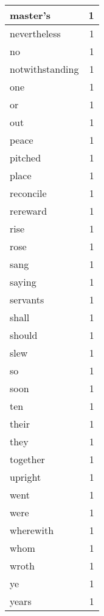 \begin{center}
\begin{longtable}{l|r}
master's & 1 \\ \hline
nevertheless & 1 \\ \hline
no & 1 \\ \hline
notwithstanding & 1 \\ \hline
one & 1 \\ \hline
or & 1 \\ \hline
out & 1 \\ \hline
peace & 1 \\ \hline
pitched & 1 \\ \hline
place & 1 \\ \hline
reconcile & 1 \\ \hline
rereward & 1 \\ \hline
rise & 1 \\ \hline
rose & 1 \\ \hline
sang & 1 \\ \hline
saying & 1 \\ \hline
servants & 1 \\ \hline
shall & 1 \\ \hline
should & 1 \\ \hline
slew & 1 \\ \hline
so & 1 \\ \hline
soon & 1 \\ \hline
ten & 1 \\ \hline
their & 1 \\ \hline
they & 1 \\ \hline
together & 1 \\ \hline
upright & 1 \\ \hline
went & 1 \\ \hline
were & 1 \\ \hline
wherewith & 1 \\ \hline
whom & 1 \\ \hline
wroth & 1 \\ \hline
ye & 1 \\ \hline
years & 1 \\ \hline
\end{longtable}
\end{center}



\normalsize



